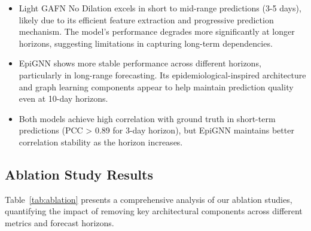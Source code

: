 \documentclass[lettersize, journal]{IEEEtran}
\begin{document}
\begin{itemize}
    \item Light GAFN No Dilation excels in short to mid-range predictions (3-5 days), likely due to its efficient feature extraction and progressive prediction mechanism. The model's performance degrades more significantly at longer horizons, suggesting limitations in capturing long-term dependencies.
    
    \item EpiGNN shows more stable performance across different horizons, particularly in long-range forecasting. Its epidemiological-inspired architecture and graph learning components appear to help maintain prediction quality even at 10-day horizons.
    
    \item Both models achieve high correlation with ground truth in short-term predictions (PCC > 0.89 for 3-day horizon), but EpiGNN maintains better correlation stability as the horizon increases.
\end{itemize}

\subsection{Ablation Study Results}
Table~\ref{tab:ablation} presents a comprehensive analysis of our ablation studies, quantifying the impact of removing key architectural components across different metrics and forecast horizons.
\end{document}
